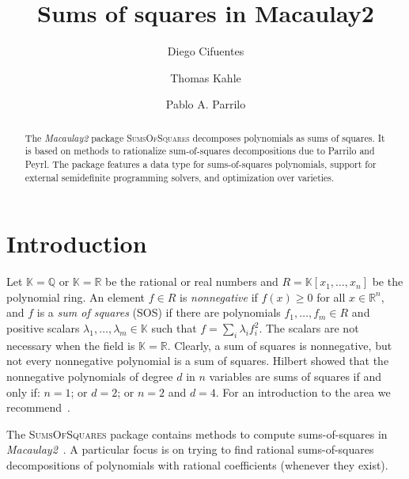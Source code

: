 \documentclass[11pt]{amsart}
\theoremstyle{plain}%
\theoremstyle{definition}
\theoremstyle{remark}
\newcommand{\Mac}{\emph{Macaulay2}\xspace}
\newcommand{\SOS}{\textsc{SumsOfSquares}\xspace}
\newcommand{\QQ}{\mathbb{Q}}
\newcommand{\RR}{\mathbb{R}}
\newcommand{\kk}{\mathbb{K}}
\begin{document}
\title[Sums of squares in Macaulay2]{Sums of squares in Macaulay2}

\author{Diego Cifuentes}
\address{Massachusetts Institute of Technology \\ Cambridge, MA, USA}

\author{Thomas Kahle}
\address{Otto-von-Guericke University \\ Magdeburg, Germany}

\author{Pablo A. Parrilo}
\address{Massachusetts Institute of Technology \\ Cambridge, MA, USA}


\begin{abstract}
  The \Mac package \SOS decomposes polynomials as sums of squares.
  It is based on methods to rationalize sum-of-squares decompositions due to Parrilo and Peyrl.
  The package features a data type for sums-of-squares polynomials, support for external semidefinite programming solvers, and optimization over varieties.
\end{abstract}

\maketitle

\section{Introduction}
\label{s:intro}

Let $\kk \!=\! \QQ$ or $\kk \!=\! \RR$ be the rational or real numbers and $R = \kk[x_{1},\dots,x_{n}]$ be the polynomial ring.
An element $f\!\in\! R$ is \emph{nonnegative} if $f(x) \!\ge\! 0$ for all $x \!\in\! \RR^{n}$,
and $f$ is a \emph{sum of squares} (SOS) if there are polynomials $f_{1},\dots,f_{m} \!\in\! R$ and positive scalars $\lambda_{1},\dots,\lambda_{m} \!\in\! \kk$ such that $f=\sum_{i}\lambda_i f_{i}^{2}$.
The scalars are not necessary when the field is $\kk\!=\!\RR$.
Clearly, a sum of squares is nonnegative, but not every nonnegative polynomial is a sum of squares.
Hilbert showed that the nonnegative polynomials of degree $d$ in $n$ variables are sums of squares if and only if: $n=1$; or $d=2$; or $n=2$ and $d=4$.
For an introduction to the area we recommend~\cite{scheiderer2009positivity,blekherman2012semidefinite}.

The \SOS package contains methods to compute sums-of-squares in \Mac~\cite{macaulay2}.
A particular focus is on trying to find rational sums-of-squares decompositions of polynomials with rational coefficients (whenever they exist).
\end{document}
